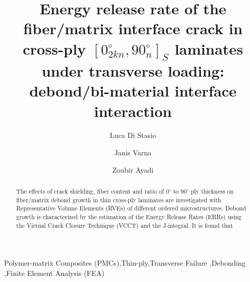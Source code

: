 \documentclass[review]{elsarticle}
\begin{document}
\begin{frontmatter}

\title{Energy release rate of the fiber/matrix interface crack in cross-ply $\left[0_{2kn}^{\circ},90_{n}^{\circ}\right]_{S}$ laminates under transverse loading: debond/bi-material interface interaction}


\author[nancy,lulea]{Luca Di Stasio}
\author[lulea]{Janis Varna}
\author[nancy]{Zoubir Ayadi}


\address[nancy]{Universit\'e de Lorraine, EEIGM, IJL, 6 Rue Bastien Lepage, F-54010 Nancy, France}
\address[lulea]{Lule\aa\ University of Technology, University Campus, SE-97187 Lule\aa, Sweden}

\begin{abstract}
\noindent
The effects of crack shielding, fiber content and ratio of $0^{\circ}$ to $90^{\circ}$ ply thickness on fiber/matrix debond growth in thin cross-ply laminates are investigated with Representative Volume Elements (RVEs) of different ordered microstructures. Debond growth is characterized by the estimation of the Energy Release Rates (ERRs) using the Virtual Crack Closure Technique (VCCT) and the J-integral. It is found that 
\end{abstract}

\begin{keyword}
Polymer-matrix Composites (PMCs)\sep Thin-ply\sep Transverse Failure \sep Debonding \sep Finite Element Analysis (FEA)
\end{keyword}


\end{frontmatter}
\end{document}
